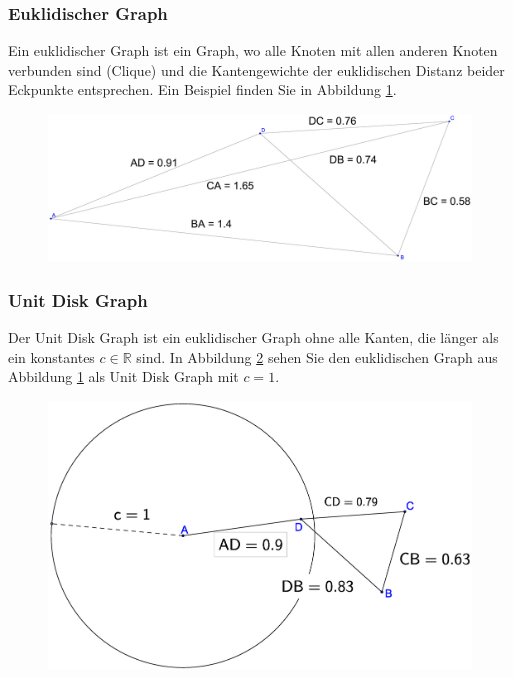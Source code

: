 \documentclass[a4paper,twoside]{IEEEtran}
\begin{document}
\subsubsection{Euklidischer Graph}
Ein euklidischer Graph ist ein Graph, wo alle Knoten mit allen anderen Knoten verbunden sind (Clique) und die Kantengewichte der euklidischen Distanz beider Eckpunkte entsprechen. Ein Beispiel finden Sie in Abbildung \ref{fig:Graph}.
\begin{figure}[h!]
\centering
\includegraphics[width=0.99\linewidth]{Graph.eps}
\caption{}
\label{fig:Graph}
\end{figure}
\subsubsection{Unit Disk Graph}
Der Unit Disk Graph ist ein euklidischer Graph ohne alle Kanten, die länger als ein konstantes $c \in \mathds{R} $ sind. In Abbildung \ref{fig:UnitGraph} sehen Sie den euklidischen Graph aus Abbildung \ref{fig:Graph} als Unit Disk Graph mit $c = 1 $.
\begin{figure}[h!]
\centering
\includegraphics[width=0.99\linewidth]{UnitGraph.eps}
\caption{}
\label{fig:UnitGraph}
\end{figure}
\end{document}
